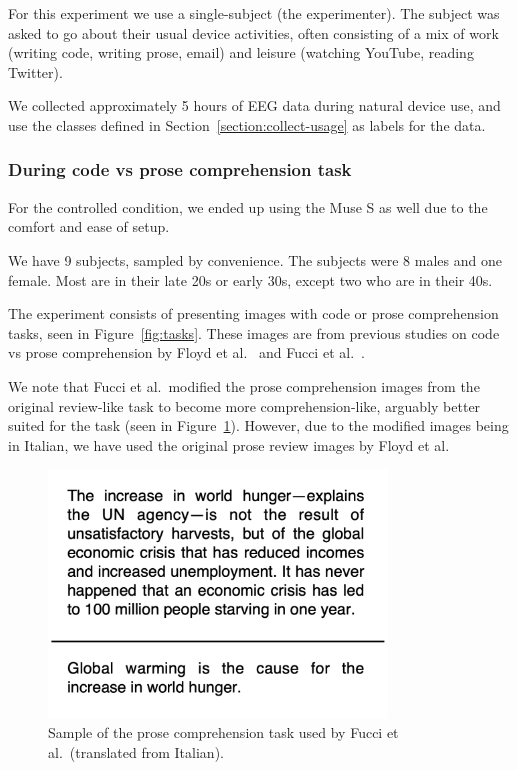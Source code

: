             For this experiment we use a single-subject (the experimenter). The subject was asked to go about their usual device activities, often consisting of a mix of work (writing code, writing prose, email) and leisure (watching YouTube, reading Twitter).
            
            We collected approximately 5 hours of EEG data during natural device use, and use the classes defined in Section~\ref{section:collect-usage} as labels for the data.

        \subsubsection*{During code vs prose comprehension task}

            For the controlled condition, we ended up using the Muse S as well due to the comfort and ease of setup.

            We have 9 subjects, sampled by convenience. The subjects were 8 males and one female. Most are in their late 20s or early 30s, except two who are in their 40s.

            The experiment consists of presenting images with code or prose comprehension tasks, seen in Figure~\ref{fig:tasks}. These images are from previous studies on code vs prose comprehension by Floyd et al.~\cite{floyd_decoding_2017} and Fucci et al.~\cite{fucci_replication_2019}. 

            

            We note that Fucci et al.~modified the prose comprehension images from the original review-like task to become more comprehension-like, arguably better suited for the task (seen in Figure~\ref{fig:prose-comp-fucci}). However, due to the modified images being in Italian, we have used the original prose review images by Floyd et al.

            \begin{figure}[H]
                \centering
                \includegraphics[width=90mm]{img/prose-comprehension.png}
                \caption{Sample of the prose comprehension task used by Fucci et al.\ (translated from Italian).}\label{fig:prose-comp-fucci}
            \end{figure}

